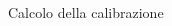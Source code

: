 \documentclass [xcolor=svgnames, 9pt] {beamer}
\begin{document}
\begin{frame}{Calcolo della calibrazione}
\begin{columns}
\begin{column}{0.57\textwidth}
		\end{column}
		\begin{column}{0.43\textwidth}
			
				\centering

\end{column}
\end{columns}
\end{frame}
\end{document}
